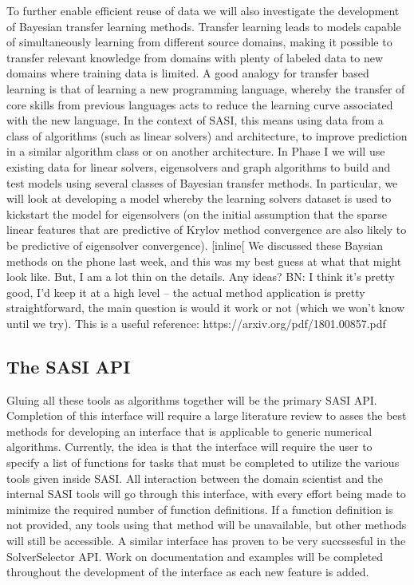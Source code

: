 To further enable efficient reuse of data we will also investigate the development of Bayesian transfer learning methods. Transfer learning leads to models capable of simultaneously learning from different source domains, making it possible to transfer relevant knowledge from domains with plenty of labeled data to new domains where training data is limited. A good analogy for transfer based learning is that of learning a new programming language, whereby the transfer of core skills from previous languages acts to reduce the learning curve associated with the new language. In the context of SASI, this means using data from a class of algorithms (such as linear solvers) and architecture,  to improve prediction in a similar algorithm class or on another architecture. In Phase I we will use existing data for linear solvers, eigensolvers and graph algorithms to build and test models using several classes of Bayesian transfer methods. In particular, we will look at developing a model whereby the learning solvers dataset is used to kickstart the model for eigensolvers (on the initial assumption that the sparse linear features that are predictive of Krylov method convergence are also likely to be predictive of eigensolver convergence).
\todo[inline[{ We discussed these Baysian methods on the phone last week, and this was my best guess at what that might look like. But, I am a lot thin on the details. Any ideas? BN: I think it's pretty good, I'd keep it at a high level -- the actual method application is pretty straightforward, the main question is would it work or not (which we won't know until we try). This is a useful reference: https://arxiv.org/pdf/1801.00857.pdf}


\subsection{The SASI API} 
Gluing all these tools as algorithms together will be the primary SASI API. Completion of this interface will require a large literature review to asses the best methods for developing an interface that is applicable to generic numerical algorithms. Currently, the idea is that the interface will require the user to specify a list of functions for tasks that must be completed to utilize the various tools given inside SASI. All interaction between the domain scientist and the internal SASI tools will go through this interface, with every effort being made to minimize the required number of function definitions. If a function definition is not provided, any tools using that method will be unavailable, but other methods will still be accessible. A similar interface has proven to be very succssesful in the SolverSelector API. Work on documentation and examples will be completed throughout the development of the interface as each new feature is added. 
 
